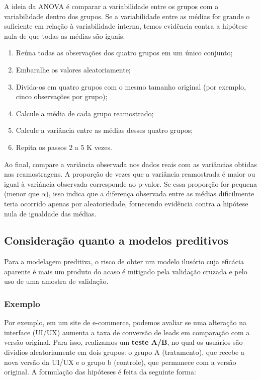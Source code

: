 \documentclass{article}
\begin{document}
A ideia da ANOVA é comparar a variabilidade entre os grupos com a variabilidade dentro dos grupos. Se a variabilidade entre as médias for grande o suficiente em relação à variabilidade interna, temos evidência contra a hipótese nula de que todas as médias são iguais. 

\begin{enumerate}
    \item Reúna todas as observações dos quatro grupos em um único conjunto;
    \item Embaralhe os valores aleatoriamente;
    \item Divida-os em quatro grupos com o mesmo tamanho original (por exemplo, cinco observações por grupo);
    \item Calcule a média de cada grupo reamostrado;
    \item Calcule a variância entre as médias desses quatro grupos;
    \item Repita os passos 2 a 5 K vezes.
\end{enumerate}

Ao final, compare a variância observada nos dados reais com as variâncias obtidas nas reamostragens. A proporção de vezes que a variância reamostrada é maior ou igual à variância observada corresponde ao p-valor. Se essa proporção for pequena (menor que $\alpha$), isso indica que a diferença observada entre as médias dificilmente teria ocorrido apenas por aleatoriedade, fornecendo evidência contra a hipótese nula de igualdade das médias.

\subsection{Consideração quanto a modelos preditivos}

Para a modelagem preditiva, o risco de obter um modelo ilusório cuja eficácia aparente é mais um produto do acaso é mitigado pela validação cruzada e pelo uso de uma amostra de validação.


\subsubsection{Exemplo}

Por exemplo, em um site de e-commerce, podemos avaliar se uma alteração na interface (UI/UX) aumenta a taxa de conversão de leads em comparação com a versão original. Para isso, realizamos um \textbf{teste A/B}, no qual os usuários são dividios aleatoriamente em dois grupos: o grupo A (tratamento), que recebe a nova versão da UI/UX e o grupo b (controle), que permanece com a versão original. A formulação das hipóteses é feita da seguinte forma:
\end{document}
